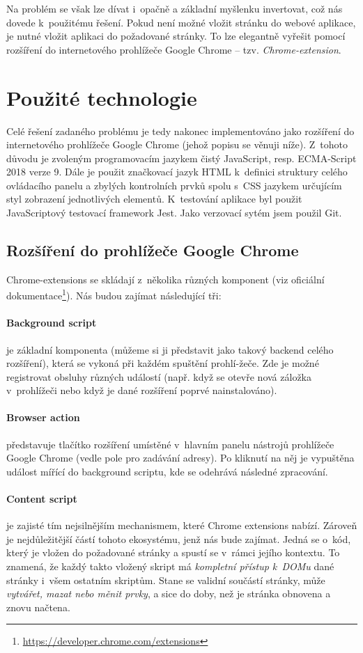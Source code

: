 \documentclass[thesis=B,czech]{FITthesis}[2012/06/26]
\begin{document}
Na problém se však lze dívat i~opačně a základní myšlenku invertovat, což nás dovede k~použitému řešení. Pokud není možné vložit stránku do webové aplikace, je nutné vložit aplikaci do požadované stránky. To lze elegantně vyřešit pomocí rozšíření do internetového prohlížeče Google Chrome -- tzv. \emph{Chrome-extension}.


\section{Použité technologie}	
\label{sec:used_technology}
Celé řešení zadaného problému je tedy nakonec implementováno jako rozšíření do internetového prohlížeče Google Chrome (jehož popisu se věnuji níže). Z~tohoto důvodu je zvoleným programovacím jazykem čistý JavaScript, resp. ECMA-Script 2018 verze 9. Dále je použit značkovací jazyk HTML k~definici struktury celého ovládacího panelu a zbylých kontrolních prvků spolu s~CSS jazykem určujícím styl zobrazení jednotlivých elementů. K~testování aplikace byl použit JavaScriptový testovací framework Jest. Jako verzovací sytém jsem použil Git.

\subsection{Rozšíření do prohlížeče Google Chrome}
Chrome-extensions se skládají z~několika různých komponent (viz oficiální dokumentace\footnote{\url{https://developer.chrome.com/extensions}}). Nás budou zajímat následující tři:
\paragraph{Background script} je základní komponenta (můžeme si ji představit jako takový backend celého rozšíření), která se vykoná při každém spuštění prohlí-žeče. Zde je možné registrovat obsluhy různých událostí (např. když se otevře nová záložka v~prohlížeči nebo když je dané rozšíření poprvé nainstalováno). 
\paragraph{Browser action} představuje tlačítko rozšíření umístěné v~hlavním panelu nástrojů prohlížeče Google Chrome (vedle pole pro zadávání adresy). Po kliknutí na něj je vypuštěna událost mířící do background scriptu, kde se odehrává následné zpracování.
\paragraph{Content script}\label{def:content_script} je zajisté tím nejsilnějším mechanismem, které Chrome extensions nabízí. Zároveň je nejdůležitější částí tohoto ekosystému, jenž nás bude zajímat. Jedná se o~kód, který je vložen do požadované stránky a spustí se v~rámci jejího kontextu. To znamená, že každý takto vložený skript má \emph{kompletní přístup k~DOMu} dané stránky i~všem ostatním skriptům. Stane se validní součástí stránky, může \emph{vytvářet, mazat nebo měnit prvky}, a sice do doby, než je stránka obnovena a znovu načtena.
\end{document}
